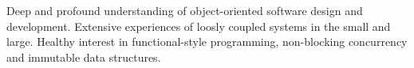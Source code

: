 {
  Deep and profound understanding of object-oriented software design and development.
  Extensive experiences of loosly coupled systems in the small and large.
  Healthy interest in functional-style programming, non-blocking concurrency and immutable data structures.
}
